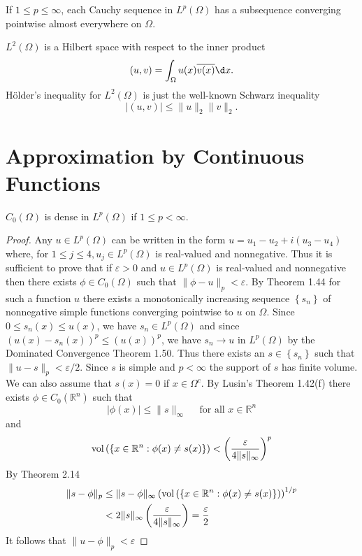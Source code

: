 \begin{corollary}
  If $1 \leq p \leq \infty$, each Cauchy sequence in $L^p(\Omega)$ has a subsequence converging pointwise almost everywhere on $\Omega$.
\end{corollary}


\begin{corollary}
  $L^2(\Omega)$ is a Hilbert space with respect to the inner product
  \[
  (u, v)=\int_{\Omega} u(x) \overline{v(x)} \d x .
  \]
  Hölder's inequality for $L^2(\Omega)$ is just the well-known Schwarz inequality
  \[
  |(u, v)| \leq\|u\|_2\|v\|_2 .
  \]
\end{corollary}


\section{Approximation by Continuous Functions}

\begin{theorem}
  $C_0(\Omega)$ is dense in $L^p(\Omega)$ if $1 \leq p<\infty$.
\end{theorem}

\begin{proof}
  Any $u \in L^p(\Omega)$ can be written in the form $u=u_1-u_2+i\left(u_3-u_4\right)$ where, for $1 \leq j \leq 4, u_j \in L^p(\Omega)$ is real-valued and nonnegative. Thus it is sufficient to prove that if $\varepsilon>0$ and $u \in L^p(\Omega)$ is real-valued and nonnegative then there exists $\phi \in C_0(\Omega)$ such that $\|\phi-u\|_p<\varepsilon$. By Theorem 1.44 for such a function $u$ there exists a monotonically increasing sequence $\left\{s_n\right\}$ of nonnegative simple functions converging pointwise to $u$ on $\Omega$. Since $0 \leq s_n(x) \leq u(x)$, we have $s_n \in L^p(\Omega)$ and since $\left(u(x)-s_n(x)\right)^p \leq(u(x))^p$, we have $s_n \rightarrow u$ in $L^p(\Omega)$ by the Dominated Convergence Theorem 1.50. Thus there exists an $s \in\left\{s_n\right\}$ such
  that $\|u-s\|_p<\varepsilon / 2$. Since $s$ is simple and $p<\infty$ the support of $s$ has finite volume. We can also assume that $s(x)=0$ if $x \in \Omega^c$. By Lusin's Theorem 1.42(f) there exists $\phi \in C_0(\mathbb{R}^n)$ such that
  \[
  |\phi(x)| \leq\|s\|_{\infty} \quad \text { for all } x \in \mathbb{R}^n
  \]
  and
  \[
  \operatorname{vol}\left(\left\{x \in \mathbb{R}^n: \phi(x) \neq s(x)\right\}\right)<\left(\frac{\varepsilon}{4\|s\|_{\infty}}\right)^p
  \]
  By Theorem 2.14
  \[
  \begin{aligned}
  \|s-\phi\|_p & \leq\|s-\phi\|_{\infty}\left(\operatorname{vol}\left(\left\{x \in \mathbb{R}^n: \phi(x) \neq s(x)\right\}\right)\right)^{1 / p} \\
  & <2\|s\|_{\infty}\left(\frac{\varepsilon}{4\|s\|_{\infty}}\right)=\frac{\varepsilon}{2}
  \end{aligned}
  \]
  It follows that $\|u-\phi\|_p<\varepsilon$
\end{proof}

